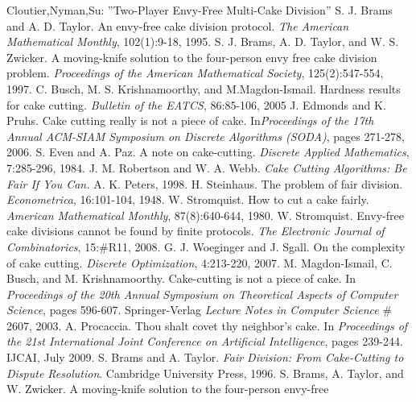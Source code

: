 \documentclass[11pt, a4paper, twoside]{article}
\numberwithin{equation}{section}
\begin{document}
\newpage
\thispagestyle{empty}
\thispagestyle{plain}
\renewcommand{\refname}{Literaturverzeichnis}
\begin{thebibliography}{9}
Cloutier,Nyman,Su:
''Two-Player Envy-Free Multi-Cake Division''
 S. J. Brams and A. D. Taylor. An
envy-free cake division protocol. \emph{The American Mathematical Monthly}, 102(1):9-18, 1995.
 S. J. Brams, A. D. Taylor, and W. S.
Zwicker. A moving-knife solution to the four-person envy
free cake division problem. \emph{Proceedings of the American
Mathematical Society}, 125(2):547-554, 1997.
\bibitem[Busch et al., 2005]{} C. Busch, M. S. Krishnamoorthy, and
M.Magdon-Ismail. Hardness results for cake cutting. \emph{Bulletin of the EATCS}, 86:85-106, 2005
 J. Edmonds and K. Pruhs. Cake
cutting really is not a piece of cake. In\emph{Proceedings of
the 17th Annual ACM-SIAM Symposium on Discrete Algorithms (SODA)}, pages 271-278, 2006.
 S. Even and A. Paz. A note on cake-cutting. \emph{Discrete Applied Mathematics}, 7:285-296, 1984.
 J. M. Robertson and W. A.
Webb. \emph{Cake Cutting Algorithms: Be Fair If You Can.} A.
K. Peters, 1998.
\bibitem[Steinhaus, 1948]{} H. Steinhaus. The problem of fair division. \emph{Econometrica}, 16:101-104, 1948.
\bibitem[Stromquist, 1980]{} W. Stromquist. How to cut a cake fairly.
\emph{American Mathematical Monthly}, 87(8):640-644, 1980.
\bibitem[Stromquist, 2008]{} W. Stromquist. Envy-free cake divisions
cannot be found by finite protocols. \emph{The Electronic Journal of Combinatorics}, 15:$\#$R11, 2008.
 G. J. Woeginger and J. Sgall.
On the complexity of cake cutting. \emph{Discrete Optimization},
4:213-220, 2007.
\bibitem[MIBK03]{} M. Magdon-Ismail, C. Busch, and M. Krishnamoorthy. Cake-cutting is not a piece of cake. In \emph{Proceedings of the 20th Annual Symposium on Theoretical Aspects of Computer Science}, pages
596-607. Springer-Verlag \emph{Lecture Notes in Computer Science} $\#$2607, 2003.
\bibitem[Pro09]{} A. Procaccia. Thou shalt covet thy neighbor's cake. In \emph{Proceedings of the 21st International Joint Conference on Artificial Intelligence}, pages 239-244. IJCAI, July 2009.
\bibitem[BT96]{} S. Brams and A. Taylor. \emph{Fair Division: From Cake-Cutting to Dispute Resolution}. Cambridge University Press, 1996.
\bibitem[BTZ97]{} S. Brams, A. Taylor, and W. Zwicker. A moving-knife solution to the four-person envy-free

\end{thebibliography}
\end{document}
